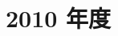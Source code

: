 \documentclass[../../hsm_tok_a.tex]{subfiles}
\begin{document}
    \section{2010 年度}

    

    \clearpage

    
\end{document}
